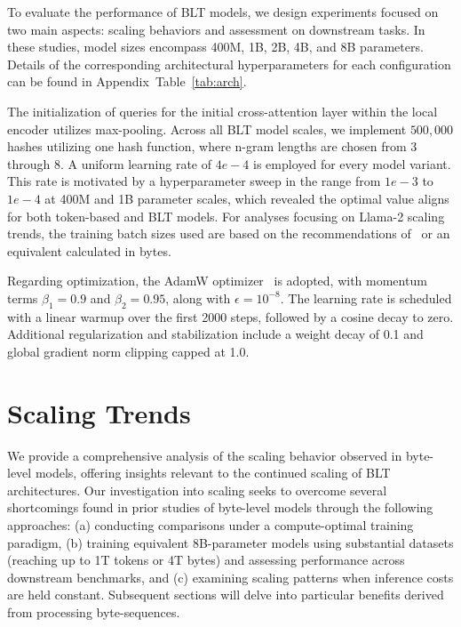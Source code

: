 To evaluate the performance of {\textsc BLT} models, we design experiments focused on two main aspects: scaling behaviors and assessment on downstream tasks. In these studies, model sizes encompass 400M, 1B, 2B, 4B, and 8B parameters. Details of the corresponding architectural hyperparameters for each configuration can be found in Appendix~Table~\ref{tab:arch}.

The initialization of queries for the initial cross-attention layer within the local encoder utilizes max-pooling. Across all {\textsc BLT} model scales, we implement $500,000$ hashes utilizing one hash function, where n-gram lengths are chosen from 3 through 8. A uniform learning rate of $4e-4$ is employed for every model variant. This rate is motivated by a hyperparameter sweep in the range from $1e-3$ to $1e-4$ at 400M and 1B parameter scales, which revealed the optimal value aligns for both token-based and {\textsc BLT} models. For analyses focusing on Llama-2 scaling trends, the training batch sizes used are based on the recommendations of~\cite{dubey2024llama} or an equivalent calculated in bytes.

Regarding optimization, the AdamW optimizer~\citep{adamw} is adopted, with momentum terms $\beta_1 = 0.9$ and $\beta_2 = 0.95$, along with $\epsilon = 10^{-8}$. The learning rate is scheduled with a linear warmup over the first 2000 steps, followed by a cosine decay to zero. Additional regularization and stabilization include a weight decay of 0.1 and global gradient norm clipping capped at 1.0.

\section{Scaling Trends}
\label{section:scaling}

We provide a comprehensive analysis of the scaling behavior observed in byte-level models, offering insights relevant to the continued scaling of {\textsc BLT} architectures. Our investigation into scaling seeks to overcome several shortcomings found in prior studies of byte-level models through the following approaches: (a) conducting comparisons under a compute-optimal training paradigm, (b) training equivalent 8B-parameter models using substantial datasets (reaching up to 1T tokens or 4T bytes) and assessing performance across downstream benchmarks, and (c) examining scaling patterns when inference costs are held constant. Subsequent sections will delve into particular benefits derived from processing byte-sequences.

